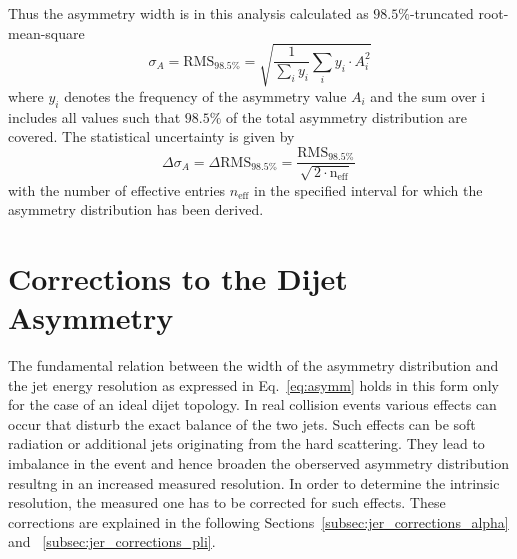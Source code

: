 Thus the asymmetry width is in this analysis calculated as $98.5\%$-truncated root-mean-square
\begin{equation}
 \sigma_A = \mathrm{RMS}_{98.5\%} = \sqrt{\frac{1}{\sum_{i} y_i} \sum_{i} y_i \cdot A_i^2}  
\end{equation} 
where $y_i$ denotes the frequency of the asymmetry value $A_i$ and the sum over i includes all values such that $98.5\%$ of the total asymmetry distribution are covered. The statistical uncertainty is given by
\begin{equation}
\Delta \sigma_A = \Delta \mathrm{RMS}_{98.5\%} = \frac{\mathrm{RMS}_{98.5\%}}{\sqrt{\, 2 \cdot \mathrm{n_\mathrm{eff}}}} \,
\end{equation} 
with the number of effective entries $n_\mathrm{eff}$ in the specified interval for which the asymmetry distribution has been derived. 

\section{Corrections to the Dijet Asymmetry}
\label{sec:jer_corrections}
The fundamental relation between the width of the asymmetry distribution and the jet energy resolution as expressed in Eq.~\ref{eq:asymm} holds in this form only for the case of an ideal dijet topology. In real collision events various effects can occur that disturb the exact balance of the two jets. Such effects can be soft radiation or additional jets originating from the hard scattering. They lead to imbalance in the event and hence broaden the oberserved asymmetry distribution resultng in an increased measured resolution. In order to determine the intrinsic resolution, the measured one has to be corrected for such effects. These corrections are explained in the following Sections~\ref{subsec:jer_corrections_alpha} and ~\ref{subsec:jer_corrections_pli}.

